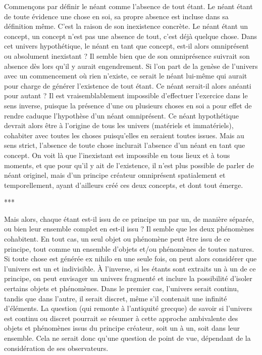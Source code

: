 Commençons par définir le néant comme l'absence de tout étant. Le néant étant de toute évidence une chose en soi, sa propre absence est incluse dans sa définition même. C’est la raison de son inexistence concrète. Le néant étant un concept, un concept n'est pas une absence de tout, c'est déjà quelque chose. Dans cet univers hypothétique, le néant en tant que concept, est-il alors omniprésent ou absolument inexistant ? Il semble bien que de son omniprésence suivrait son absence dès lors qu'il y aurait engendrement. Si l’on part de la genèse de l’univers avec un commencement où rien n’existe, ce serait le néant lui-même qui aurait pour charge de générer l’existence de tout étant. Ce néant serait-il alors anéanti pour autant ? Il est vraisemblablement impossible d’effectuer l’exercice dans le sens inverse, puisque la présence d’une ou plusieurs choses en soi a pour effet de rendre caduque l’hypothèse d’un néant omniprésent. Ce néant hypothétique devrait alors être à l’origine de tous les univers (matériels et immatériels), cohabiter avec toutes les choses puisqu'elles en seraient toutes issues. Mais au sens strict, l’absence de toute chose inclurait l’absence d’un néant en tant que concept. On voit là que l'inexistant est impossible en tous lieux et à tous moments, et que pour qu'il y ait de l'existence, il n’est plus possible de parler de néant originel, mais d’un principe créateur omniprésent spatialement et temporellement, ayant d'ailleurs créé ces deux concepts, et dont tout émerge.


\begin{center}
***
\end{center}

Mais alors, chaque étant est-il issu de ce principe un par un, de manière séparée, ou bien leur ensemble complet en est-il issu ? Il semble que les deux phénomènes cohabitent. En tout cas, un seul objet ou phénomène peut être issu de ce principe, tout comme un ensemble d’objets et/ou phénomènes de toutes natures. Si toute chose est générée ex nihilo en une seule fois, on peut alors considérer que l’univers est un et indivisible. À l’inverse, si les étants sont extraits un à un de ce principe, on peut envisager un univers fragmenté et inclure la possibilité d’isoler certains objets et phénomènes. Dans le premier cas, l’univers serait continu, tandis que dans l’autre, il serait discret, même s'il contenait une infinité d’éléments. La question (qui remonte à l’antiquité grecque) de savoir si l’univers est continu ou discret pourrait se résumer à cette approche ambivalente des objets et phénomènes issus du principe créateur, soit un à un, soit dans leur ensemble. Cela ne serait donc qu’une question de point de vue, dépendant de la considération de ses observateurs.

